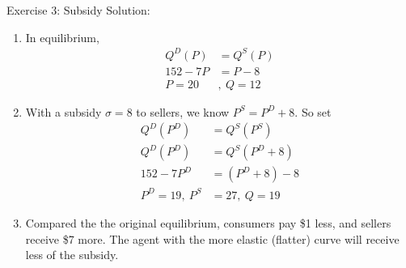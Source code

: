 \documentclass[9pt, handout]{beamer}
\begin{document}
\begin{frame}{Exercise 3: Subsidy}
    Solution:
    \begin{enumerate}
        \item In equilibrium, 
        \begin{align*}
            Q^D(P) &= Q^S(P)\\
            152 - 7P &= P - 8\\
            P = 20&, \: Q = 12
        \end{align*}
        \item With a subsidy $\sigma = 8$ to sellers, we know $P^S = P^D + 8$. So set
        \begin{align*}
            Q^D(P^D) &= Q^S(P^S)\\
            Q^D(P^D) &= Q^S(P^D + 8)\\
            152 - 7P^D &= (P^D + 8) - 8\\
            P^D = 19, \: P^S &= 27, \: Q = 19
        \end{align*}
        \item Compared the the original equilibrium, consumers pay \$1 less, and sellers receive \$7 more.  The agent with the more elastic (flatter) curve will receive less of the subsidy.
    \end{enumerate}
\end{frame}
\end{document}
